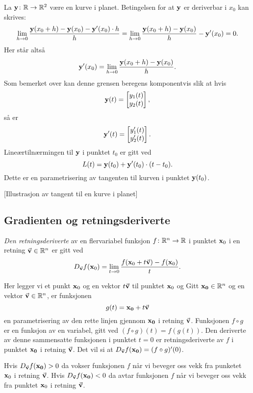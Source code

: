 \begin{eksempel}
  La $\mathbf{y} \colon \mathbb{R} \to \mathbb{R}^2$ være en kurve i planet. Betingelsen for at
  $\mathbf{y}$ er deriverbar i $x_0$  kan skrives:
  $$\lim_{h\to 0} \frac{\mathbf{y}(x_0+h) - \mathbf{y}(x_0) - \mathbf{y}'(x_0) \cdot h}{h} =
  \lim_{h\to 0} \frac{\mathbf{y}(x_0+h) - \mathbf{y}(x_0)}{h} - \mathbf{y}'(x_0) = 0.$$
  Her står altså 
  $$\mathbf{y}'(x_0) = \lim_{h\to 0} \frac{\mathbf{y}(x_0+h) - \mathbf{y}(x_0)}{h}.$$
  Som bemerket over kan denne grensen beregens komponentvis slik at hvis 
  $$\mathbf{y}(t) =
  \begin{bmatrix} y_1(t) \\ y_2(t) \end{bmatrix},$$ så er 
  $$\mathbf{y}'(t) =
  \begin{bmatrix} y_1'(t) \\ y_2'(t) \end{bmatrix}.$$
  Lineærtilnærmingen til $\mathbf{y}$ i punktet $t_0$ er gitt ved
  $$L(t) = \mathbf{y}(t_0) + \mathbf{y}'(t_0) \cdot (t - t_0).$$
  Dette er en parametrisering av tangenten til kurven i punktet $\mathbf{y}(t_0)$.
\end{eksempel}
[Illustrasjon av tangent til en kurve i planet]
\subsection{Gradienten og retningsderiverte}
\begin{definisjon}
  {\em Den retningsderiverte} av en flervariabel funksjon $f \colon \mathbb{R}^n \to
  \mathbb{R}$ i punktet $\mathbf{x}_0$ i en retning $\vec{\mathbf{v}} \in \mathbb{R}^n$ er gitt ved
  $$D_{\vec{\mathbf{v}}} f(\mathbf{x}_0) = \lim_{t\to 0} \frac{f(\mathbf{x}_0 + t\vec{\mathbf{v}}) - f(\mathbf{x}_0)}{t}.$$
\end{definisjon}

Her legger vi et punkt $\mathbf{x}_0$ og en vektor $t \vec{\mathbf{v}}$ til punktet $\mathbf{x}_0$ og
Gitt $\mathbf{x_0} \in \mathbb{R}^n$ og en vektor $\vec{\mathbf{v}} \in \mathbb{R}^n$, er funksjonen 
$$g(t) = \mathbf{x_0} + t\vec{\mathbf{v}}$$
en parametrisering av den rette linjen gjennom $\mathbf{x_0}$ i retning $\vec{\mathbf{v}}$.
Funksjonen $f \circ g$ er en funksjon av en variabel, gitt ved $(f \circ g)(t) = f(g(t))$.
Den deriverte av denne sammensatte funksjonen
i punktet $t=0$ er retningsderiverte av $f$ i punktet $\mathbf{x_0}$ i retning
$\vec{\mathbf{v}}$. Det vil si at
$D_{\vec{\mathbf{v}}} f(\mathbf{x_0}) = (f \circ g)'(0)$.

Hvis $D_{\vec{\mathbf{v}}} f(\mathbf{x_0}) > 0$ da vokser funksjonen $f$ når vi beveger oss
vekk fra punketet $\mathbf{x}_0$ i retning $\vec{\mathbf{v}}$. Hvis $D_{\vec{\mathbf{v}}} f(\mathbf{x_0}) < 0$ da
avtar funksjonen $f$ når vi beveger oss vekk fra punktet $\mathbf{x}_0$ i retning $\vec{\mathbf{v}}$.

